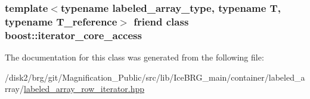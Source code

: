 \subsubsection[{boost\+::iterator\+\_\+core\+\_\+access}]{\setlength{\rightskip}{0pt plus 5cm}template$<$typename labeled\+\_\+array\+\_\+type, typename T, typename T\+\_\+reference$>$ friend class boost\+::iterator\+\_\+core\+\_\+access\hspace{0.3cm}{\ttfamily [friend]}}\label{classIceBRG_1_1labeled__array__row__iterator_ac09f73e325921cc50ebcd96bed0f8096}


The documentation for this class was generated from the following file\+:\begin{DoxyCompactItemize}
\item 
/disk2/brg/git/\+Magnification\+\_\+\+Public/src/lib/\+Ice\+B\+R\+G\+\_\+main/container/labeled\+\_\+array/\hyperlink{labeled__array__row__iterator_8hpp}{labeled\+\_\+array\+\_\+row\+\_\+iterator.\+hpp}\end{DoxyCompactItemize}
